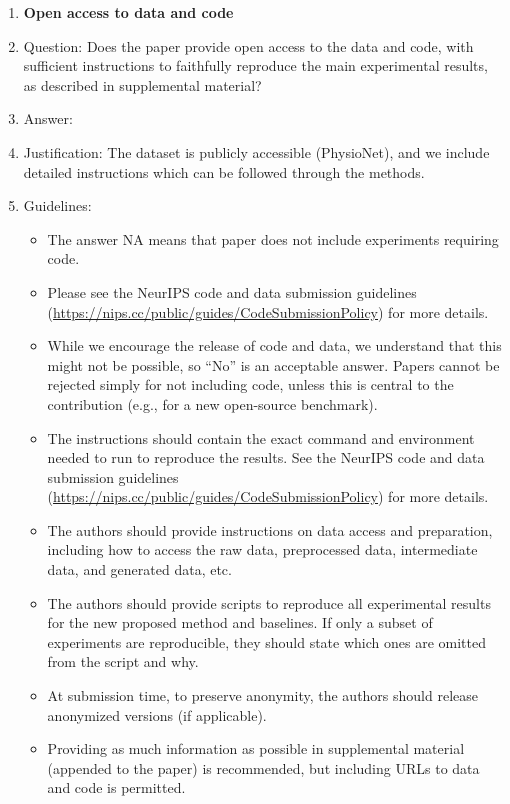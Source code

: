 \documentclass{article}
\begin{document}
\begin{enumerate}
\item {\bf Open access to data and code}
    \item[] Question: Does the paper provide open access to the data and code, with sufficient instructions to faithfully reproduce the main experimental results, as described in supplemental material?
    \item[] Answer: \answerYes{}
    \item[] Justification: The dataset is publicly accessible (PhysioNet), and we include detailed instructions which can be followed through the methods.
    \item[] Guidelines:
    \begin{itemize}
        \item The answer NA means that paper does not include experiments requiring code.
        \item Please see the NeurIPS code and data submission guidelines (\url{https://nips.cc/public/guides/CodeSubmissionPolicy}) for more details.
        \item While we encourage the release of code and data, we understand that this might not be possible, so “No” is an acceptable answer. Papers cannot be rejected simply for not including code, unless this is central to the contribution (e.g., for a new open-source benchmark).
        \item The instructions should contain the exact command and environment needed to run to reproduce the results. See the NeurIPS code and data submission guidelines (\url{https://nips.cc/public/guides/CodeSubmissionPolicy}) for more details.
        \item The authors should provide instructions on data access and preparation, including how to access the raw data, preprocessed data, intermediate data, and generated data, etc.
        \item The authors should provide scripts to reproduce all experimental results for the new proposed method and baselines. If only a subset of experiments are reproducible, they should state which ones are omitted from the script and why.
        \item At submission time, to preserve anonymity, the authors should release anonymized versions (if applicable).
        \item Providing as much information as possible in supplemental material (appended to the paper) is recommended, but including URLs to data and code is permitted.
    \end{itemize}



\end{enumerate}
\end{document}
